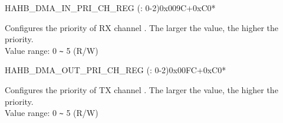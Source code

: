 \begin{register}{H}{AHB\_DMA\_IN\_PRI\_CH\_REG (: 0-2)}{0x009C+0xC0*}\label{regdesc:AHBDMAINPRICHNREG}
%
%
\regnewline%
\begin{regdesc}\begin{reglist}
\label{fielddesc:AHBDMARXPRICHN}\item [AHB\_DMA\_RX\_PRI\_CH\regindex{n}] Configures the priority of RX channel . The larger the value, the higher the priority. \\
Value range: 0 \verb+~+ 5 (R/W)
\end{reglist}\end{regdesc}
\end{register}


\begin{register}{H}{AHB\_DMA\_OUT\_PRI\_CH\_REG (: 0-2)}{0x00FC+0xC0*}\label{regdesc:AHBDMAOUTPRICHNREG}
%
%
\regnewline%
\begin{regdesc}\begin{reglist}
\label{fielddesc:AHBDMATXPRICHN}\item [AHB\_DMA\_TX\_PRI\_CH\regindex{n}] Configures the priority of TX channel . The larger the value, the higher the priority. \\
Value range: 0 \verb+~+ 5 (R/W)
\end{reglist}\end{regdesc}
\end{register}


